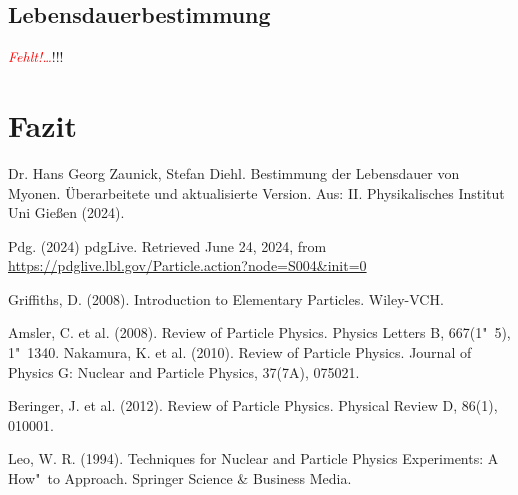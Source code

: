\documentclass[12pt,a4paper,ngerman]{report}
\providecommand{\fehlt}{\textcolor{red}{\emph{Fehlt!\dots}}}
\begin{document}
		
	\section{Lebensdauerbestimmung}
		\fehlt!!!

\chapter{Fazit}

	\listoffigures
	
	\begin{thebibliography}{111} %
		Dr. Hans Georg Zaunick, Stefan Diehl. \glqq Bestimmung der Lebensdauer von Myonen\grqq. Überarbeitete und aktualisierte Version. Aus: II. Physikalisches Institut
		Uni Gießen (2024).
		
		Pdg. (2024) pdgLive. Retrieved June 24, 2024, from \url{https://pdglive.lbl.gov/Particle.action?node=S004&init=0}

		Griffiths, D. (2008). Introduction to Elementary Particles. Wiley-VCH.

		Amsler, C. et al. (2008). Review of Particle Physics. Physics Letters B, 667(1"~5), 1"~1340.
		Nakamura, K. et al. (2010). Review of Particle Physics. Journal of Physics G: Nuclear and Particle Physics, 37(7A), 075021.

		Beringer, J. et al. (2012). Review of Particle Physics. Physical Review D, 86(1), 010001.

		Leo, W. R. (1994). Techniques for Nuclear and Particle Physics Experiments: A How"~to Approach. Springer Science \& Business Media.
		
		
		
	\end{thebibliography}
\end{document}
